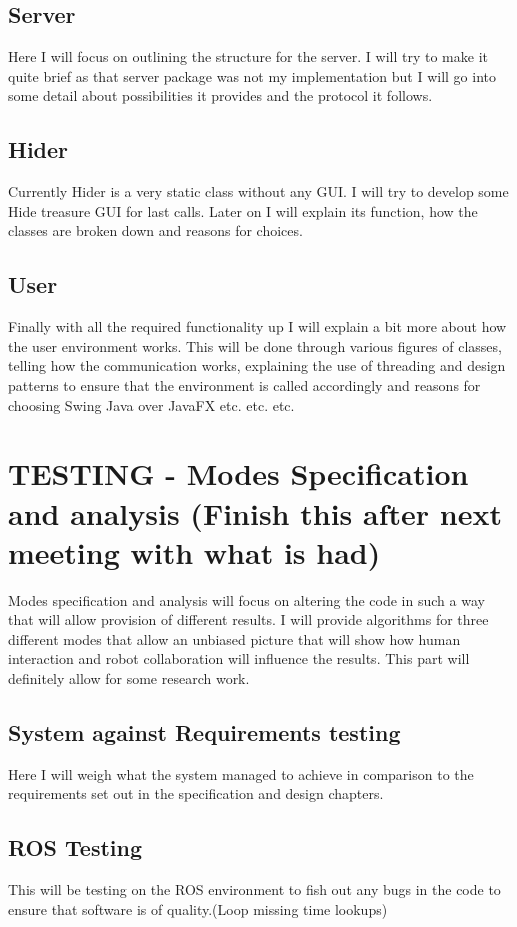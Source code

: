 \documentclass{report}
\begin{document}
    \section{Server}
      Here I will focus on outlining the structure for the server. I will try to make it quite brief as that server package was not my implementation but I will go into some detail about possibilities it provides and the protocol it follows.

    \section{Hider}
      Currently Hider is a very static class without any GUI. I will try to develop some Hide treasure GUI for last calls. Later on I will explain its function, how the classes are broken down and reasons for choices.

    \section{User}
      Finally with all the required functionality up I will explain a bit more about how the user environment works. This will be done through various figures of classes, telling how the communication works, explaining the use of threading and design patterns to ensure that the environment is called accordingly and reasons for choosing Swing Java over JavaFX etc. etc. etc.

  \chapter{TESTING - Modes Specification and analysis (Finish this after next meeting with what is had)}
    Modes specification and analysis will focus on altering the code in such a way that will allow provision of different results. I will provide algorithms for three different modes that allow an unbiased picture that will show how human interaction and robot collaboration will influence the results. This part will definitely allow for some research work.

    \section{System against Requirements testing}
      Here I will weigh what the system managed to achieve in comparison to the requirements set out in the specification and design chapters.
    \section{ROS Testing}
      This will be testing on the ROS environment to fish out any bugs in the code to ensure that software is of quality.(Loop missing time lookups)
\end{document}
